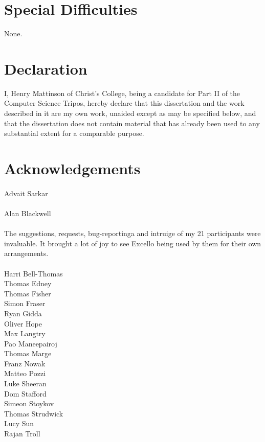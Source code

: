 \section*{Special Difficulties}

None.

\newpage
\section*{Declaration}

I, Henry Mattinson of Christ's College, being a candidate for Part II of the Computer
Science Tripos, hereby declare
that this dissertation and the work described in it are my own work,
unaided except as may be specified below, and that the dissertation
does not contain material that has already been used to any substantial
extent for a comparable purpose.

\bigskip
{}

\medskip
{}

\tableofcontents


\newpage
\section*{Acknowledgements}

\paragraph{} Advait Sarkar

\paragraph{} Alan Blackwell

\paragraph{} The suggestions, requests, bug-reportinga and intruige of my 21 participants were invaluable. It brought a lot of joy to see Excello being used by them for their own arrangements.\\
\\
Harri Bell-Thomas \\
Thomas Edney \\
Thomas Fisher \\
Simon Fraser \\
Ryan Gidda \\
Oliver Hope \\
Max Langtry \\
Pao Maneepairoj \\
Thomas Marge \\
Franz Nowak \\
Matteo Pozzi \\
Luke Sheeran \\
Dom Stafford \\
Simeon Stoykov \\
Thomas Strudwick \\
Lucy Sun \\
Rajan Troll \\
